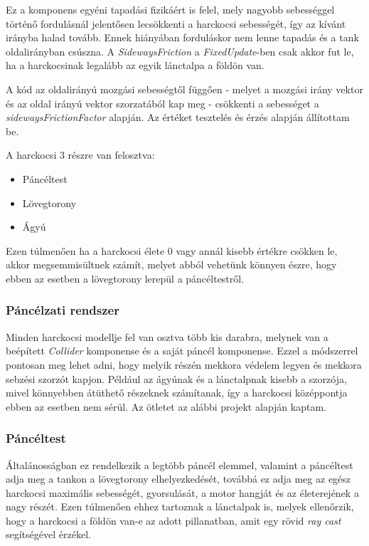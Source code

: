 \documentclass[
]{thesis-ekf}
\theoremstyle{definition}
\theoremstyle{remark}
\begin{document}
Ez a komponens egyéni tapadási fizikáért is felel, mely nagyobb sebességgel történő fordulásnál jelentősen lecsökkenti a harckocsi sebességét, így az kívánt irányba halad tovább. Ennek hiányában forduláskor nem lenne tapadás és a tank oldalirányban csúszna. A \emph{SidewaysFriction} a \emph{FixedUpdate}-ben csak akkor fut le, ha a harckocsinak legalább az egyik lánctalpa a földön van.



A kód az oldalirányú mozgási sebességtől függően - melyet a mozgási irány vektor és az oldal irányú vektor szorzatából kap meg - csökkenti a sebességet a \emph{sidewaysFrictionFactor} alapján. Az értéket tesztelés és érzés alapján állítottam be.

A harckocsi 3 részre van felosztva:
\begin{itemize}
    \item Páncéltest
    \item Lövegtorony
    \item Ágyú
\end{itemize}

Ezen túlmenően ha a harckocsi élete 0 vagy annál kisebb értékre csökken le, akkor megsemmisültnek számít, melyet abból vehetünk könnyen észre, hogy ebben az esetben a lövegtorony lerepül a páncéltestről.


\subsubsection{Páncélzati rendszer}
Minden harckocsi modellje fel van osztva több kis darabra, melynek van a beépített \emph{Collider} komponense és a saját páncél komponense. Ezzel a módszerrel pontosan meg lehet adni, hogy melyik részén mekkora védelem legyen és mekkora sebzési szorzót kapjon. Például az ágyúnak és a lánctalpnak kisebb a szorzója, mivel könnyebben átüthető részeknek számítanak, így a harckocsi középpontja ebben az esetben nem sérül. Az ötletet az alábbi projekt\cite{armoridea} alapján kaptam.

\subsubsection{Páncéltest}

Általánosságban ez rendelkezik a legtöbb páncél elemmel, valamint a páncéltest adja meg a tankon a lövegtorony elhelyezkedését, továbbá ez adja meg az egész harckocsi maximális sebességét, gyorsulását, a motor hangját és az életerejének a nagy részét. Ezen túlmenően ehhez tartoznak a lánctalpak is, melyek ellenőrzik, hogy a harckocsi a földön van-e az adott pillanatban, amit  egy rövid \emph{ray cast} segítségével érzékel.
\end{document}
